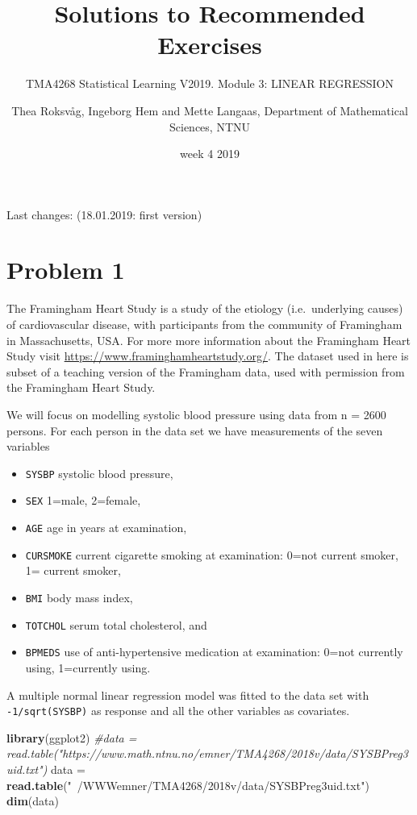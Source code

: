 \documentclass[]{article}
\title{Solutions to Recommended Exercises}
\subtitle{TMA4268 Statistical Learning V2019. Module 3: LINEAR REGRESSION}
\author{Thea Roksvåg, Ingeborg Hem and Mette Langaas, Department of Mathematical
Sciences, NTNU}
\date{week 4 2019}
\newenvironment{Shaded}{\begin{snugshade}}{\end{snugshade}}
\newcommand{\KeywordTok}[1]{\textcolor[rgb]{0.13,0.29,0.53}{\textbf{#1}}}
\newcommand{\StringTok}[1]{\textcolor[rgb]{0.31,0.60,0.02}{#1}}
\newcommand{\CommentTok}[1]{\textcolor[rgb]{0.56,0.35,0.01}{\textit{#1}}}
\newcommand{\NormalTok}[1]{#1}
\providecommand{\tightlist}{%
  \setlength{\itemsep}{0pt}\setlength{\parskip}{0pt}}
\begin{document}
\maketitle

{
\setcounter{tocdepth}{2}
\tableofcontents
}
Last changes: (18.01.2019: first version)

\section{Problem 1}\label{problem-1}

The Framingham Heart Study is a study of the etiology (i.e.~underlying
causes) of cardiovascular disease, with participants from the community
of Framingham in Massachusetts, USA. For more more information about the
Framingham Heart Study visit
\url{https://www.framinghamheartstudy.org/}. The dataset used in here is
subset of a teaching version of the Framingham data, used with
permission from the Framingham Heart Study.

We will focus on modelling systolic blood pressure using data from n =
2600 persons. For each person in the data set we have measurements of
the seven variables

\begin{itemize}
\tightlist
\item
  \texttt{SYSBP} systolic blood pressure,
\item
  \texttt{SEX} 1=male, 2=female,
\item
  \texttt{AGE} age in years at examination,
\item
  \texttt{CURSMOKE} current cigarette smoking at examination: 0=not
  current smoker, 1= current smoker,
\item
  \texttt{BMI} body mass index,
\item
  \texttt{TOTCHOL} serum total cholesterol, and
\item
  \texttt{BPMEDS} use of anti-hypertensive medication at examination:
  0=not currently using, 1=currently using.
\end{itemize}

A multiple normal linear regression model was fitted to the data set
with \texttt{-1/sqrt(SYSBP)} as response and all the other variables as
covariates.

\begin{Shaded}
\begin{Highlighting}[]
\KeywordTok{library}\NormalTok{(ggplot2)}
\CommentTok{#data = read.table("https://www.math.ntnu.no/emner/TMA4268/2018v/data/SYSBPreg3uid.txt")}
\NormalTok{data =}\StringTok{ }\KeywordTok{read.table}\NormalTok{(}\StringTok{"~/WWWemner/TMA4268/2018v/data/SYSBPreg3uid.txt"}\NormalTok{)}
\KeywordTok{dim}\NormalTok{(data)}
\end{Highlighting}
\end{Shaded}
\end{document}
